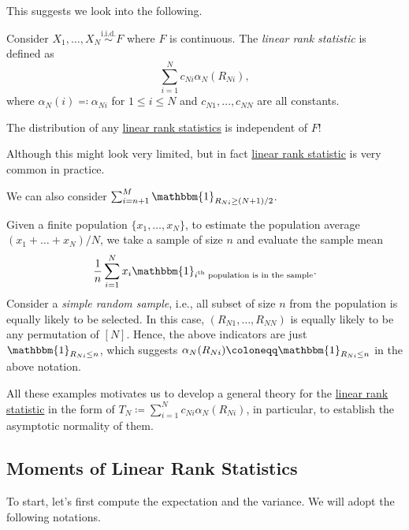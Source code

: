 This suggests we look into the following.

\begin{definition}\label{def:linrea-rank-statistic}
	Consider \(X_1, \dots , X_N \overset{\text{i.i.d.} }{\sim } F\) where \(F\) is continuous. The \emph{linear rank statistic} is defined as
	\[
		\sum_{i=1}^{N} c_{Ni} \alpha _N(R_{Ni}),
	\]
	where \(\alpha _N(i) \eqqcolon \alpha _{Ni}\) for \(1 \leq i \leq N\) and \(c_{N1}, \dots , c_{NN}\) are all constants.
\end{definition}

\begin{remark}
	The distribution of any \hyperref[def:linrea-rank-statistic]{linear rank statistics} is independent of \(F\)!
\end{remark}

Although this might look very limited, but in fact \hyperref[def:linrea-rank-statistic]{linear rank statistic} is very common in practice.

\begin{eg}
	We can also consider \(\sum_{i=n+1}^{M} \mathbbm{1}_{R_{Ni} \geq (N+1) / 2}\).
\end{eg}

\begin{eg}
	Given a finite population \(\{ x_1, \dots , x_N \} \), to estimate the population average \((x_1 + \dots + x_N) / N\), we take a sample of size \(n\) and evaluate the sample mean
	\[
		\frac{1}{n} \sum_{i=1}^{N} x_i \mathbbm{1}_{\text{\(i^{\text{th} }\) population is in the sample} } .
	\]
	Consider a \emph{simple random sample}, i.e., all subset of size \(n\) from the population is equally likely to be selected. In this case, \((R_{N1}, \dots , R_{NN})\) is equally likely to be any permutation of \([N]\). Hence, the above indicators are just \(\mathbbm{1}_{R_{Ni} \leq n} \), which suggests \(\alpha _N(R_{Ni}) \coloneqq \mathbbm{1}_{R_{Ni} \leq n} \) in the above notation.
\end{eg}

All these examples motivates us to develop a general theory for the \hyperref[def:linrea-rank-statistic]{linear rank statistic} in the form of \(T_N \coloneqq \sum_{i=1}^{N} c_{Ni} \alpha _N(R_{Ni})\), in particular, to establish the asymptotic normality of them.

\subsection{Moments of Linear Rank Statistics}
To start, let's first compute the expectation and the variance. We will adopt the following notations.

